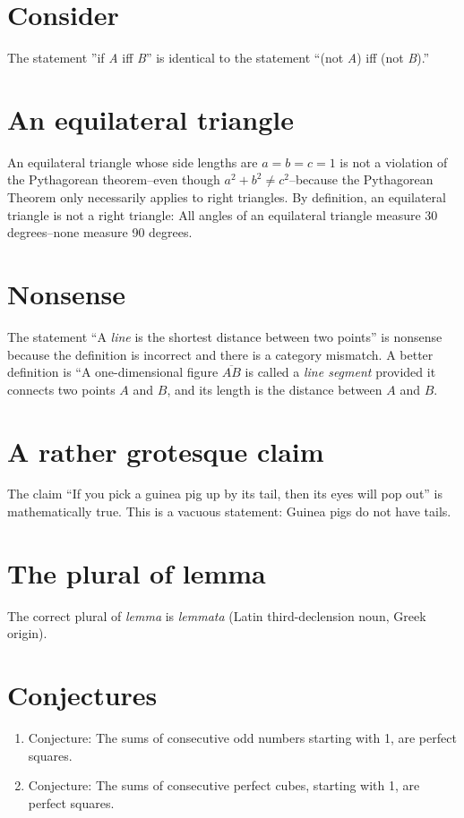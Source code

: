 \documentclass[12pt]{article}
\begin{document}
\section{Consider}
The statement ''if \textit{A} iff \textit{B}'' is identical to the statement ``(not \textit{A}) iff (not \textit{B}).''
\section{An equilateral triangle}
An equilateral triangle whose side lengths are $a=b=c=1$ is not a violation of the Pythagorean theorem--even though $a^2+b^2\neq c^2$--because the Pythagorean Theorem only necessarily applies to right triangles. By definition, an equilateral triangle is not a right triangle: All angles of an equilateral triangle measure 30 degrees--none measure 90 degrees.
\section{Nonsense}
The statement ``A \textit{line} is the shortest distance between two points'' is nonsense because the definition is incorrect and there is a category mismatch. A better definition is ``A one-dimensional figure $\overline{AB}$ is called a \textit{line segment} provided it connects two points $A$ and $B$, and its length is the distance between $A$ and $B$.
\section{A rather grotesque claim}
The claim ``If you pick a guinea pig up by its tail, then its eyes will pop out'' is mathematically true. This is a vacuous statement: Guinea pigs do not have tails.
\section{The plural of lemma}
The correct plural of \textit{lemma} is \textit{lemmata} (Latin third-declension noun, Greek origin).
\section{Conjectures}
\begin{enumerate}
\item Conjecture: The sums of consecutive odd numbers starting with 1, are perfect squares.
\item Conjecture: The sums of consecutive perfect cubes, starting with 1, are perfect squares.
\end{enumerate}
\end{document}
